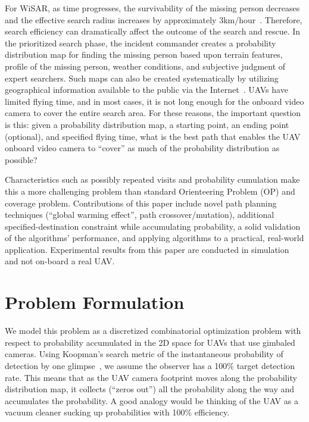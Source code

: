 For WiSAR, as time progresses, the survivability of the missing person decreases and the effective search radius increases by approximately 3km/hour~\cite{Setnicka1980Wilderness,Syrotuck2000Introduction}. Therefore, search efficiency can dramatically affect the outcome of the search and rescue. In the prioritized search phase, the incident commander creates a probability distribution map for finding the missing person based upon terrain features, profile of the missing person, weather conditions, and subjective judgment of expert searchers. Such maps can also be created systematically by utilizing geographical information available to the public via the Internet~\cite{Lin2009Bayesian,Ferguson2008GIS,Soylemez2006Utility}. UAVs have limited flying time, and in most cases, it is not long enough for the onboard video camera to cover the entire search area. For these reasons, the important question is this: given a probability distribution map, a starting point, an ending point (optional), and specified flying time, what is the best path that enables the UAV onboard video camera to ``cover'' as much of the probability distribution as possible?

Characteristics such as possibly repeated visits and probability cumulation make this a more challenging problem than standard Orienteering Problem (OP) and coverage problem. Contributions of this paper include novel path planning techniques (``global warming effect'', path crossover/mutation), additional specified-destination constraint while accumulating probability, a solid validation of the algorithms' performance, and applying algorithms to a practical, real-world application. Experimental results from this paper are conducted in simulation and not on-board a real UAV. 

\section{Problem Formulation}

We model this problem as a discretized combinatorial optimization problem with respect to probability accumulated in the 2D space for UAVs that use gimbaled cameras. Using Koopman's search metric of the instantaneous probability of detection by one glimpse~\cite{Koopman1980Search}, we assume the observer has a 100\% target detection rate. This means that as the UAV camera footprint moves along the probability distribution map, it collects (``zeros out'') all the probability along the way and accumulates the probability. A good analogy would be thinking of the UAV as a vacuum cleaner sucking up probabilities with 100\% efficiency.

